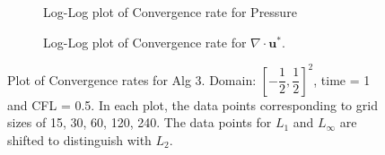 \begin{figure}[H]
	\centering
	\begin{subfigure}[t]{4.5in}
		\centering
		\caption{Log-Log plot of Convergence rate for Pressure}\label{fig:6.9a}		
	\end{subfigure}
	\quad
	\begin{subfigure}[t]{4.5in}
		\centering
		\caption{Log-Log plot of Convergence rate for $\nabla \cdot \textbf{u}^*$. }\label{fig:6.9b}
	\end{subfigure}
	\caption{Plot of Convergence rates for Alg 3. Domain: $[-\dfrac{1}{2}, \dfrac{1}{2}]^2$, time = 1 and CFL = 0.5. In each plot, the data points corresponding to grid sizes of 15, 30, 60, 120, 240. The data points for $L_1$ and $L_\infty$ are shifted to distinguish with $L_2$.}\label{fig:6.9}
\end{figure}

